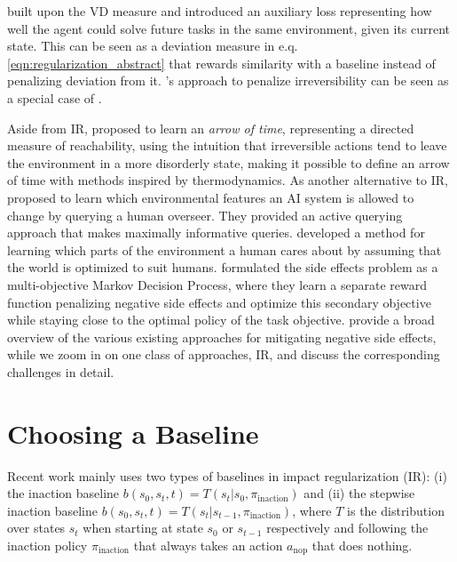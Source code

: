 \documentclass[letterpaper]{article} %
\begin{document}
\citet{krakovna2020avoiding} built upon the VD measure and introduced an auxiliary loss representing how well the agent could solve future tasks in the same environment, given its current state. This can be seen as a deviation measure in e.q. \eqref{eqn:regularization_abstract} that rewards similarity with a baseline instead of penalizing deviation from it. \citet{eysenbach2017leave}'s approach to penalize irreversibility can be seen as a special case of \citet{krakovna2020avoiding}. 

Aside from IR, \citet{rahaman2019learning} proposed to learn an \textit{arrow of time}, representing a directed measure of reachability, using the intuition that irreversible actions tend to leave the environment in a more disorderly state, making it possible to define an arrow of time with methods inspired by thermodynamics. As another alternative to IR, \citet{zhang2018minimax, zhang2020querying} proposed to learn which environmental features an AI system is allowed to change by querying a human overseer. They provided an active querying approach that makes maximally informative queries. \citet{Shah2018} developed a method for learning which parts of the environment a human cares about by assuming that the world is optimized to suit humans. \citet{saisubramanian2020multi} formulated the side effects problem as a multi-objective Markov Decision Process, where they learn a separate reward function penalizing negative side effects and optimize this secondary objective while staying close to the optimal policy of the task objective. \citet{saisubramanian2020avoiding} provide a broad overview of the various existing approaches for mitigating negative side effects, while we zoom in on one class of approaches, IR, and discuss the corresponding challenges in detail.

\section{Choosing a Baseline}
\label{sec:defining_baseline}
Recent work mainly uses two types of baselines in impact regularization (IR): (i) the inaction baseline $b(s_0, s_t, t) = T(s_t | s_0, \pi_{\mathrm{inaction}})$ and (ii) the stepwise inaction baseline $b(s_0, s_t, t) = T(s_t | s_{t-1}, \pi_{\mathrm{inaction}})$, where $T$ is the distribution over states $s_t$ when starting at state $s_0$ or $s_{t-1}$ respectively and following the inaction policy $\pi_{\mathrm{inaction}}$  that always takes an action $a_{\mathrm{nop}}$ that does nothing.
\end{document}
